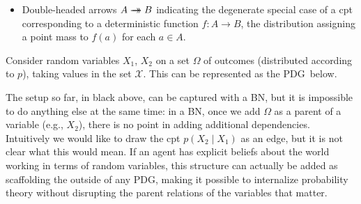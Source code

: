 \documentclass{article}
\newcommand{\doubleheadrightarrow}{%
	\rightarrow\mathrel{\mspace{-15mu}}\rightarrow}
\newcommand{\MN}{PDG}
\numberwithin{equation}{section}
\begin{document}
\begin{notfocus}
\begin{itemize}
\begin{vfull}
\begin{examplex}
\begin{center}
{}
			\end{center}
		\end{examplex}
		\end{vfull}
		\item Double-headed arrows $A \doubleheadrightarrow B$ indicating the degenerate special case of a cpt corresponding to a deterministic function $f : A \to B$, the distribution assigning a point mass to $f(a)$ for each $a \in A$.
	\end{itemize}


	
	\begin{example}\label{ex:randomvars}
		Consider random variables $X_1$, $X_2$  on a set $\Omega$ of outcomes (distributed according to $p$), taking values in the set $\mathcal X$. This can be represented as the \MN\ below.
		\begin{center}
		\end{center}
		The setup so far, in black above, can be captured with a BN, but it is impossible to do anything else at the same time: in a BN, once we add $\Omega$ as a parent of a variable (e.g., $X_2$), there is no point in adding additional dependencies. Intuitively we would like to draw the cpt $p(X_2 \mid X_1)$ as an edge, but it is not clear what this would mean.		
		If an agent has explicit beliefs about the world working in terms of random variables, this structure can actually be added as scaffolding the outside of any \MN, making it possible to internalize probability theory without disrupting the parent relations of the variables that matter.
	\end{example}


\end{notfocus}
\end{document}
